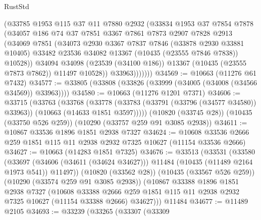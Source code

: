 \begin{lexlean}{RustStd}
\begin{coremodule}
                (@33785
                  @1953
                  @115
                  @37
                  @11
                  @7880
                  @2932
                  (@33834
                    @1953
                    @37
                    @7854
                    @7878
                    (@34057
                      @186
                      @74
                      @37
                      @7851
                      @3367
                      @7861
                      @7873
                      @2907
                      @7828
                      @2913
                      (@34069
                        @7851
                        (@34073
                          @2930
                          @3367
                          @7837
                          @7846
                          (@33878 @2930 @33881 @10405)
                          @33482
                          @23536
                          @34082
                          @13367
                          (@10435 (@23555 @7846 @7838))
                          @10528))
                      @34094
                      @34098
                      (@23539 (@34100 @186))
                      @13367
                      (@10435 (@23555 @7873 @7862))
                      @11497
                      @10528))
                  @33963)))))))
@34569 := @10663 (@11276 @61 @7432)
@34577 := @33805 (@33808 (@33826 (@33999 (@34005 (@34008 (@34566 @34569)) @33963))))
@34580 := @10663 (@11276 @1201 @7371)
@34606 := @33715
    (@33763
      (@33768
        (@33778 (@33783 (@33791 (@33796 (@34577 @34580)) @33963)) (@10663 (@14633 @1851 @3597)))))
    (@10820 (@33745 @28))
    (@10435 (@33750 @526 @259))
    (@10290 (@33757 @259 @91 @3085 @2938))
@34611 := @10867 @33536 @1896 @1851 @2938 @7327
@34624 := @10608 @33536 @2666 @259 @1851 @115 @11 @2938 @2932 @7325 @10627 (@11154 @33536 @2666)
@34627 := @10663 (@14283 @1851 @7325)
@34676 := @33513
    (@33531
      (@33580
        (@33697 (@34606 (@34611 (@34624 @34627))) @11484 (@10435 (@11489 @2164 @1973 @541)) @11497))
      (@10820 (@33562 @28))
      (@10435 (@33567 @526 @259))
      (@10290 (@33574 @259 @91 @3085 @2938))
      (@10867
        @33388
        @1896
        @1851
        @2938
        @7327
        (@10608
          @33388
          @2666
          @259
          @1851
          @115
          @11
          @2938
          @2932
          @7325
          @10627
          (@11154 @33388 @2666)
          @34627)))
    @11484
@34677 := @11489 @2105
@34693 := @33239
    (@33265
      (@33307
        (@33309

\end{coremodule}
\end{lexlean}
